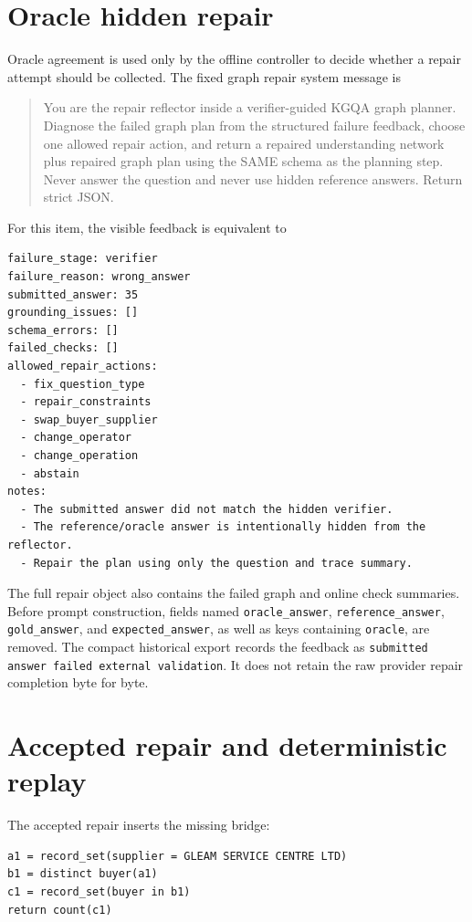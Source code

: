 \documentclass[10pt]{article}
\begin{document}
\section{Oracle hidden repair}

Oracle agreement is used only by the offline controller to decide whether a repair attempt should
be collected.  The fixed graph repair system message is
\begin{quote}\small
You are the repair reflector inside a verifier-guided KGQA graph planner. Diagnose the failed graph
plan from the structured failure feedback, choose one allowed repair action, and return a repaired
understanding network plus repaired graph plan using the SAME schema as the planning step. Never
answer the question and never use hidden reference answers. Return strict JSON.
\end{quote}

For this item, the visible feedback is equivalent to
\begin{verbatim}
failure_stage: verifier
failure_reason: wrong_answer
submitted_answer: 35
grounding_issues: []
schema_errors: []
failed_checks: []
allowed_repair_actions:
  - fix_question_type
  - repair_constraints
  - swap_buyer_supplier
  - change_operator
  - change_operation
  - abstain
notes:
  - The submitted answer did not match the hidden verifier.
  - The reference/oracle answer is intentionally hidden from the reflector.
  - Repair the plan using only the question and trace summary.
\end{verbatim}

The full repair object also contains the failed graph and online check summaries.  Before prompt
construction, fields named \texttt{oracle\_answer}, \texttt{reference\_answer},
\texttt{gold\_answer}, and \texttt{expected\_answer}, as well as keys containing
\texttt{oracle}, are removed.  The compact historical export records the feedback as
\texttt{submitted answer failed external validation}.  It does not retain the raw provider repair
completion byte for byte.

\section{Accepted repair and deterministic replay}

The accepted repair inserts the missing bridge:
\begin{verbatim}
a1 = record_set(supplier = GLEAM SERVICE CENTRE LTD)
b1 = distinct buyer(a1)
c1 = record_set(buyer in b1)
return count(c1)
\end{verbatim}
\end{document}
